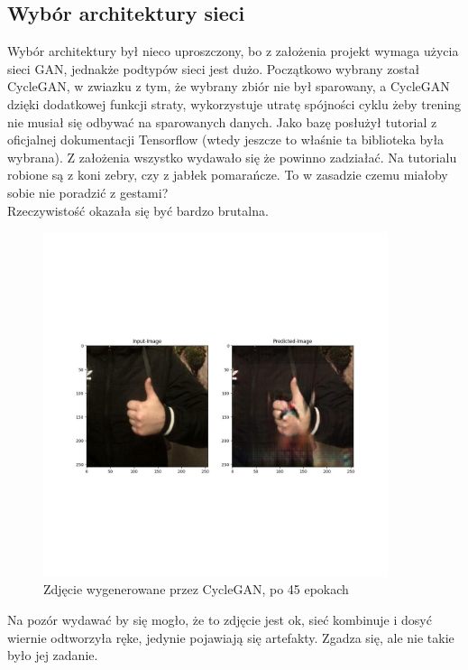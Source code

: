 \documentclass[12pt]{article}
\begin{document}
\begin{sloppypar}
{  \subsection{Wybór architektury sieci}
  {
    Wybór architektury był nieco uproszczony, bo z założenia projekt wymaga użycia sieci GAN, jednakże podtypów sieci jest dużo.
    Początkowo wybrany został CycleGAN, w zwiazku z tym, że wybrany zbiór nie był sparowany, a CycleGAN dzięki dodatkowej funkcji straty, wykorzystuje 
    utratę spójności cyklu żeby trening nie musiał się odbywać na sparowanych danych. 
    Jako bazę posłużył tutorial z oficjalnej dokumentacji Tensorflow \cite{cyclegan-tf} (wtedy jeszcze to właśnie ta biblioteka była wybrana).
    Z założenia wszystko wydawało się że powinno zadziałać. Na tutorialu robione są z koni zebry, czy z jabłek pomarańcze. 
    To w zasadzie czemu miałoby sobie nie poradzić z gestami?\\
    Rzeczywistość okazała się być bardzo brutalna.
    \begin{figure}[H]
      \centering
      \includegraphics[width=0.9\textwidth]{cycle-gan-45.jpg}
      \caption{Zdjęcie wygenerowane przez CycleGAN, po 45 epokach \cite{cyclegan-tf}}
      \label{fig:cycle-gan-przyklad}
    \end{figure}
    Na pozór wydawać by się mogło, że to zdjęcie jest ok, sieć kombinuje i dosyć wiernie odtworzyła ręke, jedynie pojawiają się artefakty.
    Zgadza się, ale nie takie było jej zadanie. 
}}
\end{sloppypar}
\end{document}
